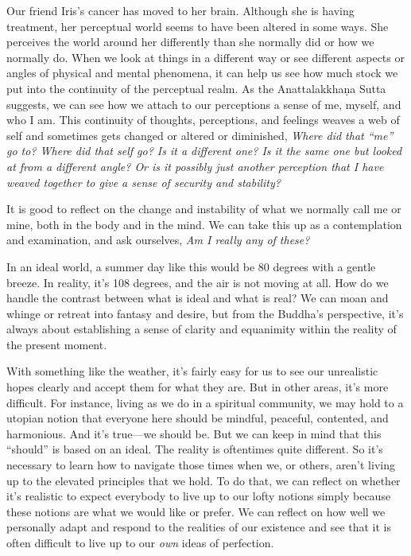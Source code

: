 Our friend Iris's cancer has moved to her brain. Although she is having 
treatment, her perceptual world seems to have been altered in some 
ways. She perceives the world around her differently than she normally 
did or how we normally do. When we look at things in a different way or 
see different aspects or angles of physical and mental phenomena, it 
can help us see how much stock we put into the continuity of the 
perceptual realm. As the Anattalakkhaṇa Sutta suggests, we can see 
how we attach to our perceptions a sense of me, myself, and who I am. 
This continuity of thoughts, perceptions, and feelings weaves a web of 
self and sometimes gets changed or altered or diminished, \emph{Where 
did that ``me'' go to? Where did that self go? Is it a different one? 
Is it the same one but looked at from a different angle? Or is it 
possibly just another perception that I have weaved together to give a 
sense of security and stability?}

It is good to reflect on the change and instability of what we normally 
call me or mine, both in the body and in the mind. We can take this up 
as a contemplation and examination, and ask ourselves, \emph{Am I 
really any of these?}


In an ideal world, a summer day like this would be 80 degrees with a 
gentle breeze. In reality, it's 108 degrees, and the air is not moving 
at all. How do we handle the contrast between what is ideal and what is 
real? We can moan and whinge or retreat into fantasy and desire, but 
from the Buddha's perspective, it's always about establishing a sense 
of clarity and equanimity within the reality of the present moment.

With something like the weather, it's fairly easy for us to see our 
unrealistic hopes clearly and accept them for what they are. But in 
other areas, it's more difficult. For instance, living as we do in a 
spiritual community, we may hold to a utopian notion that everyone here 
should be mindful, peaceful, contented, and harmonious. And it's 
true---we should be. But we can keep in mind that this ``should'' is 
based on an ideal. The reality is oftentimes quite different. So it's 
necessary to learn how to navigate those times when we, or others, 
aren't living up to the elevated principles that we hold. To do that, 
we can reflect on whether it's realistic to expect everybody to live up 
to our lofty notions simply because these notions are what we would 
like or prefer. We can reflect on how well we personally adapt and 
respond to the realities of our existence and see that it is often 
difficult to live up to our \emph{own} ideas of perfection.

